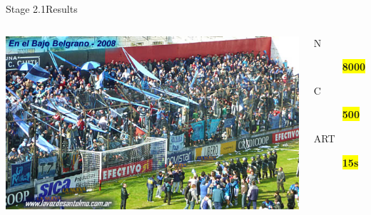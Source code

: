 \documentclass[utf8]{beamer}
\begin{document}
\begin{frame}{Stage 2.1}{Results}
	\begin{columns}
			\includegraphics[top=-1,width=\textwidth]{img/results-3-1.jpg}
			\begin{description}
				\item[N] \textbf{\colorbox{yellow}{\Large 8000}}
				\item[C] \textbf{\colorbox{yellow}{\Large 500}}
				\item[ART] \textbf{\colorbox{yellow}{\color{red}\Large 15s}}
			\end{description}
	\end{columns}
\end{frame}
\end{document}
